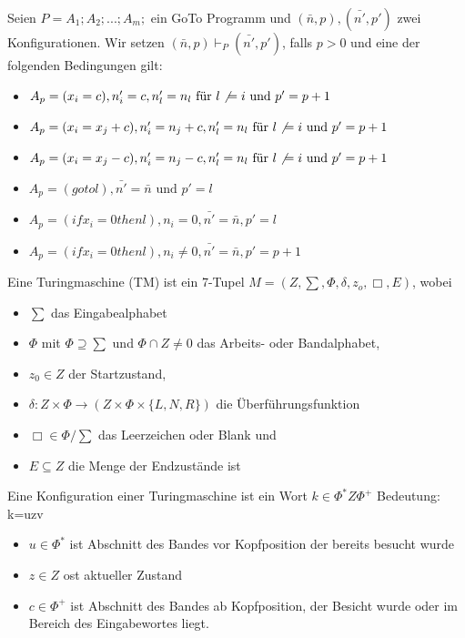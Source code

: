 \documentclass[avery5371]{flashcards}
\begin{document}
\begin{flashcard}[Definition]{} Seien $P=A_1;A_2;...;A_m;$ ein GoTo Programm und $(\bar{n},p), (\bar{n'},p')$ zwei Konfigurationen. Wir setzen $(\bar{n},p)\vdash_P (\bar{n'},p')$, falls $p>0$ und eine der folgenden Bedingungen gilt:\begin{itemize}
\item $A_p=(x_i=c), n'_i=c, n'_l=n_l \text{ für } l\not\ =i \text { und } p'=p+1$
\item $A_p=(x_i=x_j+c), n'_i=n_j+c, n'_l=n_l \text{ für } l\not\ =i \text{ und } p'=p+1$
\item $A_p=(x_i=x_j-c), n'_i=n_j-c, n'_l=n_l \text{ für } l\not\ =i \text{ und } p'=p+1$
\item $A_p=(goto l), \bar{n'}=\bar{n} \text{ und } p'=l$
\item $A_p=(if x_i=0 then l), n_i=0, \bar{n'}=\bar{n}, p'=l$
\item $A_p=(if x_i=0 then l), n_i\not=0, \bar{n'}=\bar{n}, p'=p+1$
    \end{itemize}
\end{flashcard}

\begin{flashcard}[Definition]{ Eine Turingmaschine (TM)} ist ein 7-Tupel $M=(Z,\sum, \Phi, \delta, z_o, \Box, E)$, wobei\begin{itemize}
\item $\sum$ das Eingabealphabet
\item $\Phi$ mit $\Phi\supseteq\sum$ und $\Phi\cap Z\not= 0$ das Arbeits- oder Bandalphabet,
\item $z_0\in Z$ der Startzustand,
\item $\delta:Z\times\Phi\rightarrow(Z\times\Phi\times\{L,N,R\})$ die Überführungsfunktion
\item $\Box\in\Phi/\sum$ das Leerzeichen oder Blank und
\item $E\subseteq Z$ die Menge der Endzustände ist
\end{itemize}
\end{flashcard}

\begin{flashcard}[Definition]{} Eine Konfiguration einer Turingmaschine ist ein Wort $k\in\Phi^*Z\Phi^+$
Bedeutung: k=uzv\begin{itemize}
\item $u\in\Phi^*$ ist Abschnitt des Bandes vor Kopfposition der bereits besucht wurde
\item $z\in Z$ ost aktueller Zustand
\item $c\in\Phi^+$ ist Abschnitt des Bandes ab Kopfposition, der Besicht wurde oder im Bereich des Eingabewortes liegt.
\end{itemize}
\end{flashcard}
\end{document}

